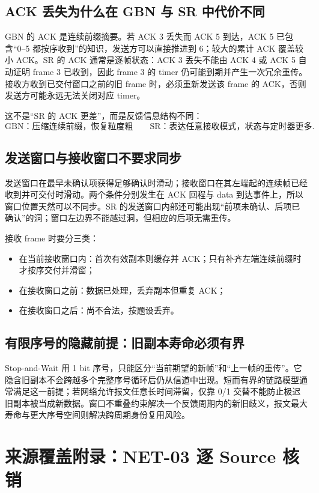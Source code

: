 \documentclass[UTF8,fontset=none,11pt,a4paper]{ctexart}
\providecommand{\tightlist}{\setlength{\itemsep}{0pt}\setlength{\parskip}{0pt}}
\begin{document}
\subsection{ACK 丢失为什么在 GBN 与 SR 中代价不同}

GBN 的 ACK 是连续前缀摘要。若 ACK 3 丢失而 ACK 5 到达，ACK 5 已包含“0--5 都按序收到”的知识，发送方可以直接推进到 6；较大的累计 ACK 覆盖较小 ACK。SR 的 ACK 通常是逐帧状态：ACK 3 丢失不能由 ACK 4 或 ACK 5 自动证明 frame 3 已收到，因此 frame 3 的 timer 仍可能到期并产生一次冗余重传。接收方收到已交付窗口之前的旧 frame 时，必须重新发送该 frame 的 ACK，否则发送方可能永远无法关闭对应 timer。

这不是“SR 的 ACK 更差”，而是反馈信息结构不同：
\[
\boxed{\text{GBN：压缩连续前缀，恢复粒度粗}}
\qquad
\boxed{\text{SR：表达任意接收模式，状态与定时器更多}}.
\]

\subsection{发送窗口与接收窗口不要求同步}

发送窗口在最早未确认项获得足够确认时滑动；接收窗口在其左端起的连续帧已经收到并可交付时滑动。两个条件分别发生在 ACK 回程与 data 到达事件上，所以窗口位置天然可以不同步。SR 的发送窗口内部还可能出现“前项未确认、后项已确认”的洞；窗口左边界不能越过洞，但相应的后项无需重传。

接收 frame 时要分三类：
\begin{itemize}
\tightlist
\item 在当前接收窗口内：首次有效副本则缓存并 ACK；只有补齐左端连续前缀时才按序交付并滑窗；
\item 在接收窗口之前：数据已处理，丢弃副本但重复 ACK；
\item 在接收窗口之后：尚不合法，按题设丢弃。
\end{itemize}

\subsection{有限序号的隐藏前提：旧副本寿命必须有界}

Stop-and-Wait 用 1 bit 序号，只能区分“当前期望的新帧”和“上一帧的重传”。它隐含旧副本不会跨越多个完整序号循环后仍从信道中出现。短而有界的链路模型通常满足这一前提；若网络允许报文任意长时间滞留，仅靠 0/1 交替不能防止极迟旧副本被当成新数据。窗口不重叠约束解决一个反馈周期内的新旧歧义，报文最大寿命与更大序号空间则解决跨周期身份复用风险。

\section{来源覆盖附录：NET-03 逐 Source 核销}
\end{document}
